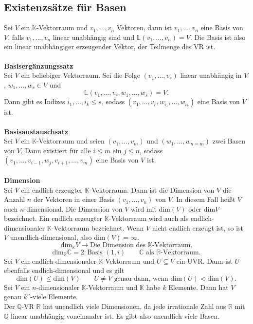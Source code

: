 \documentclass[a4paper,12pt]{article}
\begin{document}
\subsection{Existenzsätze für Basen}
Sei $V$ ein $\mathbb{K}$-Vektorraum und $v_1,\hdots ,v_n$ Vektoren, dann ist $v_1,\hdots ,v_n$ eine Basis von $V$, falls $v_1,\hdots ,v_n$ linear unabhängig sind und $\mathbb{L}\left(v_1,\hdots ,v_n\right)=V$. Die Basis ist also ein linear unabhängiger erzeugender Vektor, der Teilmenge des VR ist.
\\\hfill\\\textbf{Basisergänzungssatz}\\ 
Sei $V$ ein beliebiger Vektorraum. Sei die Folge $\left(v_1,\hdots ,v_r\right)$ linear unabhängig in $V$, $w_1,\hdots ,w_s \in V$ und
\[ 
        \mathbb{L}\left(v_1,\hdots ,v_r,w_1,\hdots ,w_s\right)=V
.\] 
Dann gibt es Indizes $i_1,\hdots ,i_k\leq s$, sodass $\left(v_1,\hdots ,v_r,w_{i_1},\hdots ,w_{i_k}\right)$ eine Basis von $V$ ist.
\\\hfill\\\textbf{Basisaustauschsatz}\\ 
Sei $V$ ein $\mathbb{K}$-Vektorraum und seien $\left(v_1,\hdots ,v_m\right)$ und $\left(w_1,\hdots ,w_{n=m}\right)$ zwei Basen von $V$. Dann existiert für alle $i\leq m$ ein $j\leq n$, sodass $\left(v_1,\hdots ,v_{i-1},w_j,v_{i+1},\hdots ,v_m\right)$ eine Basis von $V$ ist. 
\\\hfill\\\textbf{Dimension}\\ 
Sei $V$ ein endlich erzeugter $\mathbb{K}$-Vektorraum. Dann ist die Dimension von $V$ die Anzahl $n$ der Vektoren in einer Basis $\left(v_1,\hdots ,v_n\right)$ von $V$. In diesem Fall heißt $V$ auch $n$-dimensional. Die Dimension von $V$ wird mit $\text{dim}\left(V\right)$ oder $\text{dim}V$ bezeichnet. Ein endlich erzeugter $\mathbb{K}$-Vektorraum wird auch als endlich-dimensionaler $\mathbb{K}$-Vektorraum bezeichnet. Wenn $V$ nicht endlich erzeugt ist, so ist $V$ unendlich-dimensional, also $\text{dim}\left(V\right)=\infty$.
\[ 
        \text{dim}_\mathbb{K}V\rightarrow \text{Die Dimension des $\mathbb{K}$-Vektorraum}
.\] 
\[ 
        \text{dim}_\mathbb{R}\mathbb{C}=2:\text{Basis }\left(1,i\right)\qquad \mathbb{C}\text{ als }\mathbb{R}\text{-Vektorraum}
.\] 
Sei $V$ ein endlich-dimensionaler $\mathbb{K}$-Vektorraum und $U\subseteq V$ ein UVR. Dann ist $U$ ebenfalls endlich-dimensional und es gilt
\[ 
        \text{dim}\left(U\right)\leq \text{dim}\left(V\right)\qquad U\neq V\text{ genau dann, wenn }\text{dim}\left(U\right)<\text{dim}\left(V\right)
.\] 
Sei $V$ ein $n$-dimensionaler $\mathbb{K}$-Vektorraum und $\mathbb{K}$ habe $k$ Elemente. Dann hat $V$ genau $k^{n}$-viele Elemente.\\Der $\mathbb{Q}$-VR $\mathbb{R}$ hat unendlich viele Dimensionen, da jede irrationale Zahl aus $\mathbb{R}$ mit $\mathbb{Q}$ linear unabhängig voneinander ist. Es gibt also unendlich viele Basen.
\end{document}
